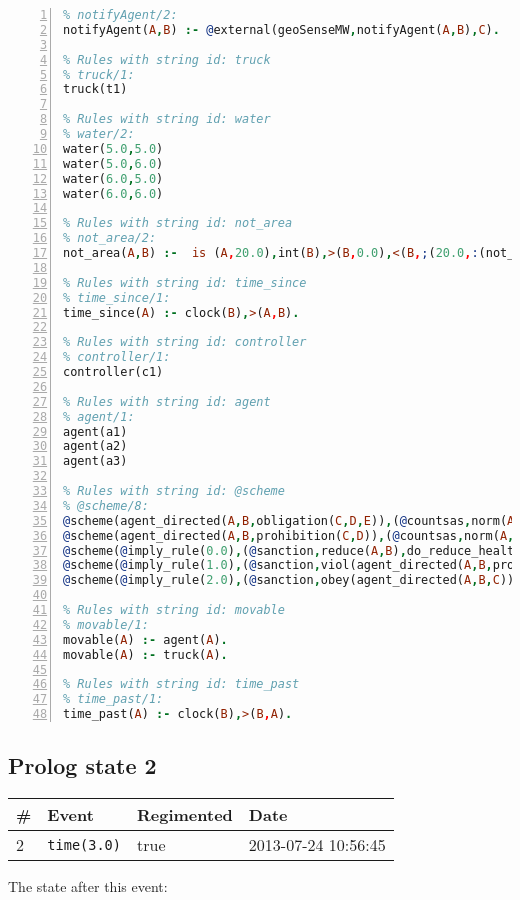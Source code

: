 \documentclass[11pt]{article}\usepackage[utf8]{inputenc}\usepackage{geometry}
\begin{document}
\begin{lstlisting}[language=Prolog, numbers=left]
% Rules with string id: notifyAgent
% notifyAgent/2:
notifyAgent(A,B) :- @external(geoSenseMW,notifyAgent(A,B),C).

% Rules with string id: truck
% truck/1:
truck(t1)

% Rules with string id: water
% water/2:
water(5.0,5.0)
water(5.0,6.0)
water(6.0,5.0)
water(6.0,6.0)

% Rules with string id: not_area
% not_area/2:
not_area(A,B) :-  is (A,20.0),int(B),>(B,0.0),<(B,;(20.0,:(not_area(A,B), is (-(B),20.0)))),int(A),>(A,0.0),<(A,;(20.0,:(area(A,B),-(int(A))))),int(B),>(A,0.0),>(B,0.0),<(A,21.0),<(B,21.0).

% Rules with string id: time_since
% time_since/1:
time_since(A) :- clock(B),>(A,B).

% Rules with string id: controller
% controller/1:
controller(c1)

% Rules with string id: agent
% agent/1:
agent(a1)
agent(a2)
agent(a3)

% Rules with string id: @scheme
% @scheme/8:
@scheme(agent_directed(A,B,obligation(C,D,E)),(@countsas,norm(A,B,F,obligation(C,D,E)),F),false,(listTrue(C)),(time_past(D)),false,[plus(viol(agent_directed(A,B,obligation(C,D,E))))|[]],[plus(obey(agent_directed(A,B,obligation(C,D,E))))|[]])
@scheme(agent_directed(A,B,prohibition(C,D)),(@countsas,norm(A,B,E,prohibition(C,D)),E),(listTrue(C)),false,(false),false,[plus(viol(agent_directed(A,B,prohibition(C,D))))|[]],[plus(obey(agent_directed(A,B,prohibition(C,D))))|[]])
@scheme(@imply_rule(0.0),(@sanction,reduce(A,B),do_reduce_health(A,B),notifyAgent(A,changed(status))),true,false,false,false,[min(reduce(A,B))|[]],[])
@scheme(@imply_rule(1.0),(@sanction,viol(agent_directed(A,B,prohibition(C,D))),do_sanction(D)),true,false,false,false,[min(viol(agent_directed(A,B,prohibition(C,D))))|[]],[])
@scheme(@imply_rule(2.0),(@sanction,obey(agent_directed(A,B,C))),true,false,false,false,[min(obey(agent_directed(A,B,C)))|[]],[])

% Rules with string id: movable
% movable/1:
movable(A) :- agent(A).
movable(A) :- truck(A).

% Rules with string id: time_past
% time_past/1:
time_past(A) :- clock(B),>(B,A).

\end{lstlisting}
\clearpage 
\subsection{Prolog state 2}
\begin{table}[ht]
\centering 
\begin{tabular}{l l l l} 
\textbf{\#} & \textbf{Event} & \textbf{Regimented} & \textbf{Date} \\ [0.5ex] 
\hline
2&\texttt{time(3.0)}&true&2013-07-24 10:56:45\\ [1ex] \hline\end{tabular}
\end{table}
The state after this event:
\end{document}
